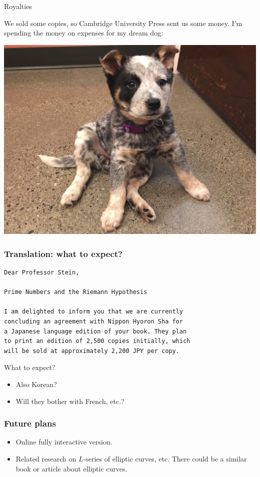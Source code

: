 \documentclass{beamer}
\begin{document}
\begin{frame}{Royalties}

  We sold some copies, so Cambridge University Press sent us some money.
  I'm spending the money on expenses for my dream dog:

  \begin{center}
    \includegraphics[height=.7\textheight]{pics/bella-puppy}
  \end{center}


\end{frame}


\begin{frame}[fragile]
  \frametitle{Translation: what to expect?}
  \begin{verbatim}
Dear Professor Stein,

Prime Numbers and the Riemann Hypothesis

I am delighted to inform you that we are currently
concluding an agreement with Nippon Hyoron Sha for
a Japanese language edition of your book. They plan
to print an edition of 2,500 copies initially, which
will be sold at approximately 2,200 JPY per copy.
  \end{verbatim}

  What to expect?
  \begin{itemize}
    \item  Also Korean?
    \item  Will they bother with French, etc.?
  \end{itemize}
\end{frame}


\begin{frame}
  \frametitle{Future plans}
  \begin{itemize}
    \item Online fully interactive version.
    \item Related research on $L$-series of elliptic curves, etc. There could be a similar book or article about elliptic curves.
  \end{itemize}
\end{frame}
\end{document}
